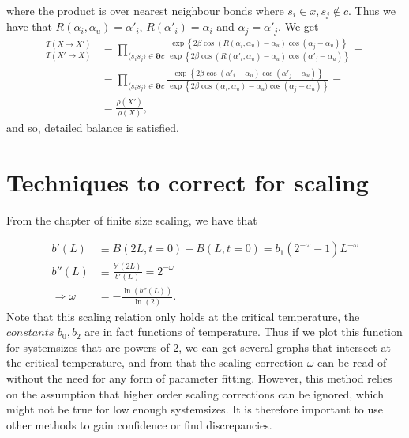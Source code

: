 where the product is over nearest neighbour bonds where $s_i \in x, s_j \notin c$.
Thus we have that $ R(\alpha_i,\alpha_u) = \alpha'_i $, $R(\alpha'_i) = \alpha_i$ and $\alpha_j = \alpha'_j$.
We get
\begin{align}
  \frac{T(X\rightarrow X')}{T(X'\rightarrow X)}&= \prod_{\langle s_i s_j \rangle \in \bm{\partial} c} \frac{ \exp\left\{2\beta\cos(R(\alpha_i,\alpha_u) - \alpha_u)\cos(\alpha_j - \alpha_u)\right\}}{ \exp\left\{2\beta\cos(R(\alpha'_i,\alpha_u) - \alpha_u)\cos(\alpha'_j -\alpha_u)\right\}} = \\
  &= \prod_{\langle s_i s_j \rangle \in \bm{\partial} c} \frac{ \exp\left\{2\beta\cos(\alpha'_i - \alpha_u)\cos(\alpha'_j - \alpha_u)\right\}}{ \exp\left\{2\beta\cos(\alpha_i,\alpha_u) - \alpha_u)\cos(\alpha_j -\alpha_u)\right\}} = \\
  &= \frac{\rho(X')}{\rho(X)},
\end{align}
and so, detailed balance is satisfied.

\section{Techniques to correct for scaling}
From the chapter of finite size scaling, we have that

\begin{align}
  b'(L) &\equiv B(2L,t=0) - B(L,t=0) = b_1(2^{-\omega} -1)L^{-\omega}\\
  b''(L)&\equiv \frac{b'(2L)}{b'(L)} = 2^{-\omega}\\
  \Rightarrow \omega &= -\frac{\ln(b''(L))}{\ln(2)}.
\end{align}
Note that this scaling relation only holds at the critical temperature, the $\textit{constants}$ $b_0, b_2$ are in fact functions of temperature. 
Thus if we plot this function for systemsizes that are powers of 2, we can get several graphs that intersect at the critical temperature, and from that the scaling correction $\omega$ can be read of without the need for any form of parameter fitting. 
However, this method relies on the assumption that higher order scaling corrections can be ignored, which might not be true for low enough systemsizes.
It is therefore important to use other methods to gain confidence or find discrepancies.


